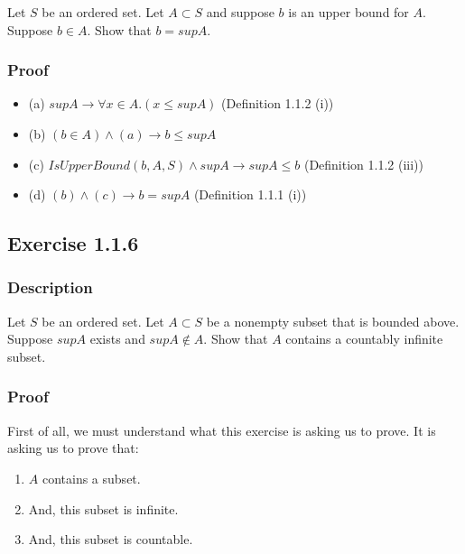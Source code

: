 \documentclass[12pt, letterpaper, oneside]{book}
\begin{document}
Let $S$ be an ordered set. Let $A \subset S$ and suppose $b$ is an upper bound for $A$. Suppose $b \in A$. Show that
$b = sup A$.

\subsubsection{Proof}

\begin{itemize}
  \item (a) $sup A \rightarrow \forall x \in A. (x \le sup A)$ (Definition 1.1.2 (i))
  \item (b) $(b \in A) \land (a) \rightarrow b \le sup A$
  \item (c) $IsUpperBound(b, A, S) \land sup A \rightarrow sup A \le b$ (Definition 1.1.2 (iii))
  \item (d) $(b) \land (c) \rightarrow b = sup A$ (Definition 1.1.1 (i))
\end{itemize}

\subsection{Exercise 1.1.6}

\subsubsection{Description}

Let $S$ be an ordered set. Let $A \subset S$ be a nonempty subset that is bounded above. Suppose $sup A$ exists and
$sup A \notin A$. Show that $A$ contains a countably infinite subset.

\subsubsection{Proof}

First of all, we must understand what this exercise is asking us to prove. It is asking us to prove that:
\begin{enumerate}
  \item $A$ contains a subset.
  \item And, this subset is infinite.
  \item And, this subset is countable.
\end{enumerate}
\end{document}
